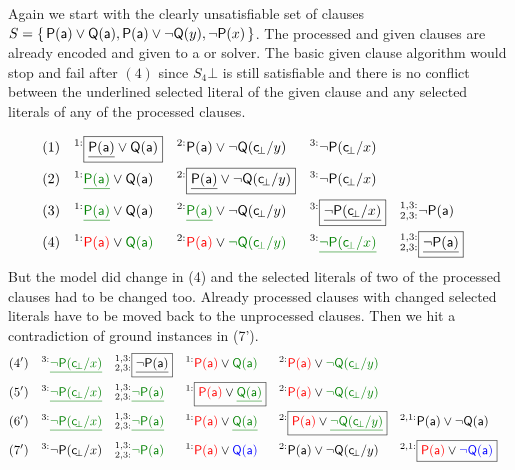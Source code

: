 \begin{example}
	Again we start with the clearly unsatisfiable set of clauses
\( S=\{ \, \mathsf{P}(\mathsf{a})\lor\mathsf{Q}(\mathsf{a}), \mathsf{P}(\mathsf{a})\lor\lnot\mathsf{Q}(y), \lnot\mathsf{P}(x) \, \} \).
	The processed and given clauses are already encoded and
	given to a \SAT{} or \SMT{} solver.
	The basic given clause algorithm would stop and fail after \( (4) \)
	since \( S_4\bot \) is still satisfiable and there is no conflict between the underlined selected literal of the given clause
	and any selected literals of any of the processed clauses.

	\begin{align*}
	(1)\quad^{1:}&\boxed{\underline{\mP(\ma)}\lor\mQ(\ma)}
	& ^{2:}&\mP(\ma)\lor\lnot\mQ(\consbot/y)
	& ^{3:}&\lnot\mP(\consbot/x)
	\\
	(2)\quad^{1:}&{\colHi\underline{\mP(\ma)}}\lor\mQ(\ma)
	& ^{2:}&\boxed{\underline{\mP(\ma)}\lor\lnot\mQ(\consbot/y)}
	& ^{3:}&\lnot\mP(\consbot/x)
	\\
	(3)\quad^{1:}&{\colHi\underline{\mP(\ma)}}\lor\mQ(\ma)
	& ^{2:}&{\colHi\underline{\mP(\ma)}}\lor\lnot\mQ(\consbot/y)
	& ^{3:}&\boxed{\underline{\lnot\mP(\consbot/x)}}
	& ^{1,3:}_{2,3:}&\lnot\mP(\ma)
	\\
	(4)\quad
	^{1:}&{\colLo\mP(\ma)}\lor\colHi\mQ(\ma)
	& ^{2:}&{\colLo\mP(\ma)}\lor\colHi\lnot\mQ(\consbot/y)
	& ^{3:}&{\colHi\underline{\lnot\mP(\consbot/x)}}
	& ^{1,3:}_{2,3:}&\boxed{\underline{\lnot\mP(\ma)}}
	\end{align*}
	But the model did change in (4) and the selected literals of two of the processed clauses had to be changed too.
	Already processed clauses with changed selected literals have to be moved back to the unprocessed clauses.
	Then we hit a contradiction of ground instances in (7').
	\begin{align*}
	(4')\quad^{3:}&{\underline{\colHi\lnot\mP(\consbot/x)}}
	& ^{1,3:}_{2,3:}&\boxed{\underline{\lnot\mP(\ma)}}
	& ^{1:}&{\colLo\mP(\ma)}\lor\colHi\mQ(\ma)
	& ^{2:}&{\colLo\mP(\ma)}\lor\colHi\lnot\mQ(\consbot/y)
	\\
	(5')\quad^{3:}&{\underline{\colHi\lnot\mP(\consbot/x)}}
	& ^{1,3:}_{2,3:}&\colHi\underline{\lnot\mP(\ma)}
	& ^{1:}&\boxed{{\colLo\mP(\ma)}\lor\colHi\underline{\mQ(\ma)}}
	& ^{2:}&{\colLo\mP(\ma)}\lor\colHi\lnot\mQ(\consbot/y)
	\\
	(6')\quad^{3:}&{\colHi\underline{\lnot\mP(\consbot/x)}}
	& ^{1,3:}_{2,3:}&\colHi\underline{\lnot\mP(\ma)}
	& ^{1:}&{\colLo\mP(\ma)}\lor\colHi\underline{\mQ(\ma)}
	& ^{2:}&\boxed{{\colLo\mP(\ma)}\lor\colHi\underline{\lnot\mQ(\consbot/y)}}
	& ^{2,1:}&\mP(\ma)\lor\lnot\mQ(\ma)
	\\
	(7')\quad^{3:}&{\lnot\mP(\consbot/x)}
	& ^{1,3:}_{2,3:}&\colHi\lnot\mP(\tikzmark{NP}\ma)
	& ^{1:}&{\colLo\mP(\tikzmark{PP}\ma)}\lor\colN\mQ(\tikzmark{PQ}\ma)
	& ^{2:}&{\mP(\ma)\lor\lnot\mQ(\consbot/y)}
	& ^{2,1:}&\boxed{{\colLo\mP(\tikzmark{PA}\ma)}\lor\colN\lnot\mQ(\tikzmark{NQ}\ma)}
	\end{align*}


\end{example}
